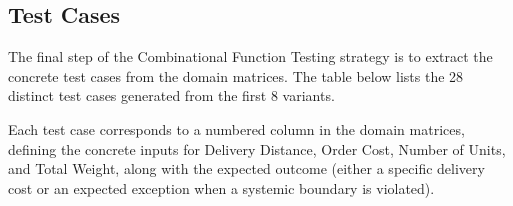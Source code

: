 \documentclass[11pt, a4paper]{article}
\begin{document}
\clearpage

\subsection{Test Cases}

The final step of the Combinational Function Testing strategy is to extract the
concrete test cases from the domain matrices. The table below lists the 28 distinct test
cases generated from the first 8 variants.

Each test case corresponds to a numbered column in the domain matrices, defining the concrete
inputs for Delivery Distance, Order Cost, Number of Units, and Total Weight, along with the
expected outcome (either a specific delivery cost or an expected exception when a systemic
boundary is violated).
\end{document}
